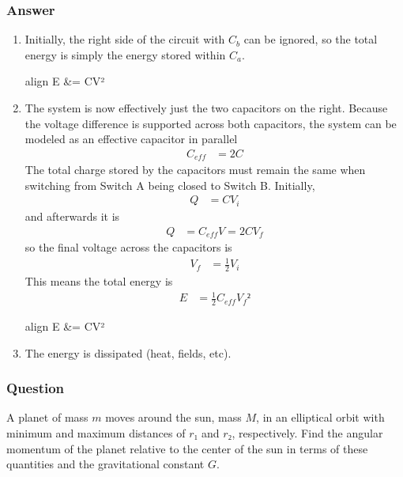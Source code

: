 \subsubsection{Answer}
\begin{enumerate}
	\item
		Initially, the right side of the circuit with $C_b$ can be ignored,
		so the total energy is simply the energy stored within $C_a$.
		\begin{empheq}[box=\fbox]{align}
			E &=  CV²
		\end{empheq}
	\item
		The system is now effectively just the two capacitors on the right.
		Because the voltage difference is supported across both capacitors,
		the system can be modeled as an effective capacitor in parallel
		\begin{align*}
			C_{eff} &= 2C
		\end{align*}
		The total charge stored by the capacitors must remain the same when
		switching from Switch A being closed to Switch B. Initially,
		\begin{align*}
			Q &= CV_i
		\end{align*}
		and afterwards it is
		\begin{align*}
			Q &= C_{eff}V = 2CV_f
		\end{align*}
		so the final voltage across the capacitors is
		\begin{align*}
			V_f &= \frac 12 V_i
		\end{align*}
		This means the total energy is
		\begin{align*}
			E &= \frac 12 C_{eff} {V_f}²
		\end{align*}
		\begin{empheq}[box=\fbox]{align}
			E &=  CV²
		\end{empheq}
	\item
		The energy is dissipated (heat, fields, etc).
\end{enumerate}

\subsubsection{Question}

A planet of mass $m$ moves around the sun, mass $M$, in an elliptical orbit
with minimum and maximum distances of $r₁$ and $r₂$, respectively. Find the
angular momentum of the planet relative to the center of the sun in terms of
these quantities and the gravitational constant $G$.

